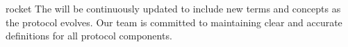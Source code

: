 \begin{mfai-box-scale}{rocket}
The  will be continuously updated to include new terms and concepts as the protocol evolves. Our team is committed to maintaining clear and accurate definitions for all protocol components.
\end{mfai-box-scale}

\newpage 